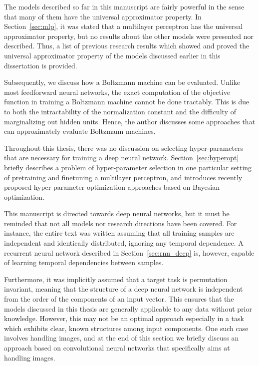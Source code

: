 \documentclass{now}
\begin{document}
The models described so far in this manuscript are fairly powerful in the sense
that many of them have the universal approximator property. In
Section~\ref{sec:mlp}, it was stated that a multilayer perceptron has the
universal approximator property, but no results about the other models were
presented nor described.  Thus, a list of previous research results which showed
and proved the universal approximator property of the models discussed earlier
in this dissertation is provided.

Subsequently, we discuss how a Boltzmann machine can be evaluated. Unlike most
feedforward neural networks, the exact computation of the objective function in
training a Boltzmann machine cannot be done tractably. This is due to both the
intractability of the normalization constant and the difficulty of marginalizing
out hidden units. Hence, the author discusses some approaches that can
approximately evaluate Boltzmann machines.

Throughout this thesis, there was no discussion on selecting hyper-parameters
that are necessary for training a deep neural network.
Section~\ref{sec:hyperopt} briefly describes a problem of hyper-parameter
selection in one particular setting of pretraining and finetuning a multilayer
perceptron, and introduces recently proposed hyper-parameter optimization
approaches based on Bayesian optimization.

This manuscript is directed towards deep neural networks, but it must be
reminded that not all models nor research directions have been covered. For
instance, the entire text was written assuming that all training samples are
independent and identically distributed, ignoring any temporal dependence.  A
recurrent neural network described in Section~\ref{sec:rnn_deep} is, however,
capable of learning temporal dependencies between samples.

Furthermore, it was implicitly assumed that a target task is permutation
invariant, meaning that the structure of a deep neural network is independent
from the order of the components of an input vector. This ensures that the
models discussed in this thesis are generally applicable to any data without
prior knowledge. However, this may not be an optimal approach especially in a
task which exhibits clear, known structures among input components. One such
case involves handling images, and at the end of this section we briefly discuss
an approach based on convolutional neural networks that specifically aims at
handling images.
\end{document}
